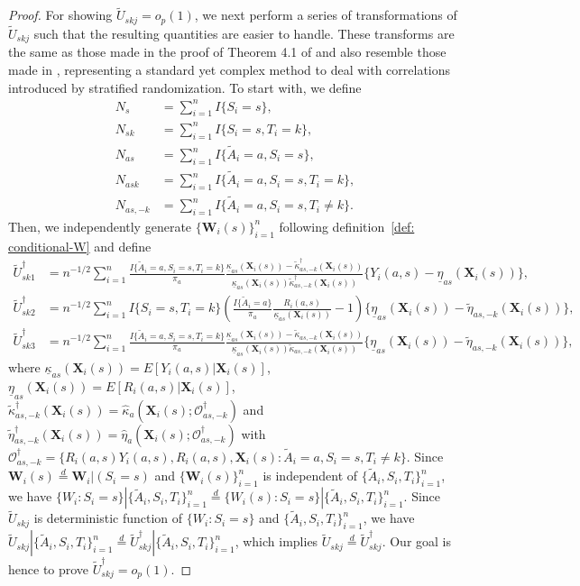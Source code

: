 \documentclass[12pt]{article}
\newcommand{\bX}{\boldsymbol{X}}
\newcommand{\bW}{\boldsymbol{W}}
\newcommand{\tA}{\widetilde{A}}
\begin{document}
\begin{proof}
For showing $\widetilde{U}_{skj}= o_p(1)$, we next perform a series of transformations of $\widetilde{U}_{skj}$ such that the resulting quantities are easier to handle. These transforms are the same as those made in the proof of Theorem 4.1 of \cite{rafi2023efficient} and also resemble those made in \cite{wang2023model}, representing a standard yet complex method to deal with correlations introduced by stratified randomization. To start with, we define
\begin{align*}
    N_s &= \sum_{i=1}^n I\{S_i=s\}, \\
    N_{sk} &= \sum_{i=1}^n I\{S_i=s, T_i =k\}, \\
    N_{as} &= \sum_{i=1}^n I\{\tA_i =a, S_i=s\},\\
    N_{ask} &= \sum_{i=1}^n I\{\tA_i=a,S_i=s, T_i=k\}, \\
    N_{as,-k} &= \sum_{i=1}^n I\{\tA_i=a,S_i=s, T_i\ne k\}.
\end{align*}
Then, we independently generate $\{\bW_i(s)\}_{i=1}^n$ following definition~\ref{def: conditional-W} and define
\begin{align*}
    \widetilde{U}_{sk1}^\dagger &= n^{-1/2} \sum_{i=1}^n \frac{I\{\tA_i=a,S_i=s, T_i=k\}}{\pi_a} \frac{\underline{\kappa}_{as}(\bX_i(s)) - \widetilde{\kappa}_{as,-k}^\dagger(\bX_i(s))}{\underline{\kappa}_{as}(\bX_i(s))\widetilde{\kappa}_{as,-k}^\dagger(\bX_i(s))}\{Y_i(a,s) - \underline{\eta}_{as}(\bX_i(s))\},\\
    \widetilde{U}_{sk2}^\dagger &= n^{-1/2} \sum_{i=1}^n I\{S_i=s, T_i=k\}\left(\frac{I\{\tA_i=a\}}{\pi_a} \frac{R_i(a,s)}{\underline{\kappa}_{as}(\bX_i(s))}-1\right)  \{\underline{\eta}_{as}(\bX_i(s))-\widetilde{\eta}_{as,-k}(\bX_i(s))\},\\
    \widetilde{U}_{sk3}^\dagger &= n^{-1/2} \sum_{i=1}^n \frac{I\{\tA_i=a,S_i=s, T_i=k\}}{\pi_a} \frac{\underline{\kappa}_{as}(\bX_i(s)) - \widetilde{\kappa} _{as,-k}(\bX_i(s))}{\underline{\kappa}_{as}(\bX_i(s))\widetilde{\kappa} _{as,-k}(\bX_i(s))}\{\underline{\eta}_{as}(\bX_i(s))-\widetilde{\eta}_{as,-k}(\bX_i(s))\},
\end{align*}
where $\underline{\kappa}_{as}(\bX_i(s))= E[Y_i(a,s)|\bX_i(s)]$,  $\underline{\eta}_{as}(\bX_i(s))= E[R_i(a,s)|\bX_i(s)]$, $\widetilde{\kappa}_{as,-k}^\dagger(\bX_i(s)) = \widehat{\kappa}_{a}(\bX_i(s); \mathcal{O}^\dagger_{as,-k})$ and $\widetilde{\eta}_{as,-k}^\dagger(\bX_i(s)) = \widehat{\eta}_{a}(\bX_i(s); \mathcal{O}^\dagger_{as,-k})$ with $\mathcal{O}^\dagger_{as,-k} = \{R_i(a,s)Y_i(a,s), R_i(a,s), \bX_i(s): \tA_i = a, S_i=s, T_i\ne k\}$. Since $\bW_i(s)\overset{d}{=} \bW_i|(S_i=s)$ and $\{\bW_i(s)\}_{i=1}^n$  is independent of $\{\tA_i, S_i, T_i\}_{i=1}^n$, we have $\{W_i:S_i=s\}|\{\tA_i, S_i, T_i\}_{i=1}^n \overset{d}{=} \{W_i(s):S_i=s\}|\{\tA_i, S_i, T_i\}_{i=1}^n$. Since $ \widetilde{U}_{skj}$ is deterministic function of $\{W_i:S_i=s\}$ and $\{\tA_i, S_i, T_i\}_{i=1}^n$, we have $ \widetilde{U}_{skj}|\{\tA_i, S_i, T_i\}_{i=1}^n \overset{d}{=} \widetilde{U}_{skj}^\dagger|\{\tA_i, S_i, T_i\}_{i=1}^n$, which implies $\widetilde{U}_{skj} \overset{d}{=} \widetilde{U}_{skj}^\dagger$. Our goal is hence to prove $\widetilde{U}_{skj}^\dagger = o_p(1)$.


\end{proof}
\end{document}

